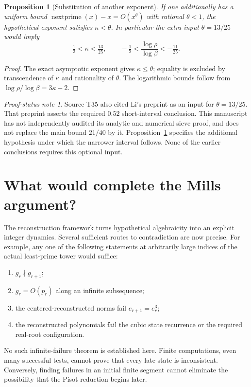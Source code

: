 \documentclass[11pt,a4paper]{article}
\newtheorem{proposition}[theorem]{Proposition}
\theoremstyle{definition}\newtheorem{definition}[theorem]{Definition}
\theoremstyle{remark}\newtheorem{remark}[theorem]{Remark}
\newtheorem{audit}[theorem]{Proof-status note}
\begin{document}
\begin{proposition}[Substitution of another exponent]\label{prop:theta}
If one additionally has a uniform bound
$\operatorname{nextprime}(x)-x=O(x^\theta)$ with rational $\theta<1$, the hypothetical exponent satisfies $\kappa<\theta$. In particular the extra input $\theta=13/25$ would imply
\[
 \tfrac12<\kappa<\tfrac{13}{25},\qquad
 -\tfrac12<\frac{\log\rho}{\log\beta}<-\tfrac{11}{25}.
\]
\end{proposition}
\begin{proof}
The exact asymptotic exponent gives $\kappa\le\theta$; equality is excluded by transcendence of $\kappa$ and rationality of $\theta$. The logarithmic bounds follow from $\log\rho/\log\beta=3\kappa-2$.
\end{proof}
\begin{audit}
Source T35 also cited Li's preprint \cite{li} as an input for $\theta=13/25$. That preprint asserts the required $0.52$ short-interval conclusion. This manuscript has not independently audited its analytic and numerical sieve proof, and does not replace the main bound $21/40$ by it. Proposition~\ref{prop:theta} specifies the additional hypothesis under which the narrower interval follows. None of the earlier conclusions requires this optional input.
\end{audit}

\section{What would complete the Mills argument?}
The reconstruction framework turns hypothetical algebraicity into an explicit integer dynamics. Several sufficient routes to contradiction are now precise. For example, any one of the following statements at arbitrarily large indices of the actual least-prime tower would suffice:
\begin{enumerate}
\item $g_r\nmid g_{r+1}$;
\item $g_r=O(p_r)$ along an infinite subsequence;
\item the centered-reconstructed norms fail $e_{r+1}=e_r^3$;
\item the reconstructed polynomials fail the cubic state recurrence or the required real-root configuration.
\end{enumerate}
No such infinite-failure theorem is established here. Finite computations, even many successful tests, cannot prove that every late state is inconsistent. Conversely, finding failures in an initial finite segment cannot eliminate the possibility that the Pisot reduction begins later.
\end{document}
